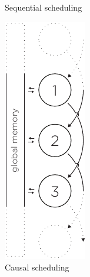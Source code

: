\begin{figure}
\begin{minipage}[t]{0.20\textwidth}
    \vfill
    \caption{Sequential scheduling}
    \label{fig:total-scheduling}
  \end{minipage}
  \hfill
  \vrule
  \hfill
  \begin{minipage}[t]{0.20\textwidth}
    \centering
    \includegraphics[page=2, height=2\linewidth]{../resources/invariance.pdf}
    \vfill
    \caption{Causal scheduling}
    \label{fig:causal-scheduling}
  \end{minipage}
\end{figure}

